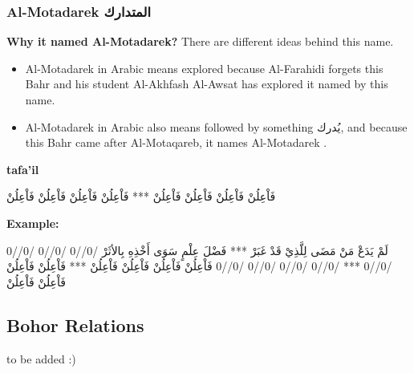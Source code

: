 

\subsubsection{Al-Motadarek \textarabic{المتدارك}}
\textbf{Why it named Al-Motadarek?}
There are different ideas behind this name.
\begin{itemize}
  \item Al-Motadarek in Arabic means explored because Al-Farahidi forgets this Bahr and his student Al-Akhfash Al-Awsat has explored it named by this name.
  \item Al-Motadarek in Arabic also means followed by something \textarabic{يُدرك}, and because this Bahr came after Al-Motaqareb, it names Al-Motadarek \cite{Alkafi1994}.\\
  \end{itemize}

\textbf{tafa'il}

\begin{Arabic}
  \begin{traditionalpoem*}
فَاْعِلُنْ فَاْعِلُنْ فَاْعِلُنْ فَاْعِلُنْ *** فَاْعِلُنْ فَاْعِلُنْ فَاْعِلُنْ فَاْعِلُنْ
	\end{traditionalpoem*}
      \end{Arabic}

      \textbf{Example:}

\begin{Arabic}
 \begin{traditionalpoem*}
    لَمْ يَدَعْ مَنْ مَضَى لِلَّذِيْ قَدْ غَبَرْ *** فَضْلَ عِلْمٍ سَوَى أَخْذِهِ بِالأثَرْ
    /0//0 /0//0 /0//0 /0//0 *** /0//0 /0//0 /0//0 /0//0
    فَاْعِلُنْ فَاْعِلُنْ فَاْعِلُنْ فَاْعِلُنْ *** فَاْعِلُنْ فَاْعِلُنْ فَاْعِلُنْ فَاْعِلُنْ
 \end{traditionalpoem*}
\end{Arabic}
  
  \newpage
  \subsection{Bohor Relations}
  to be added :) 
  \newpage

